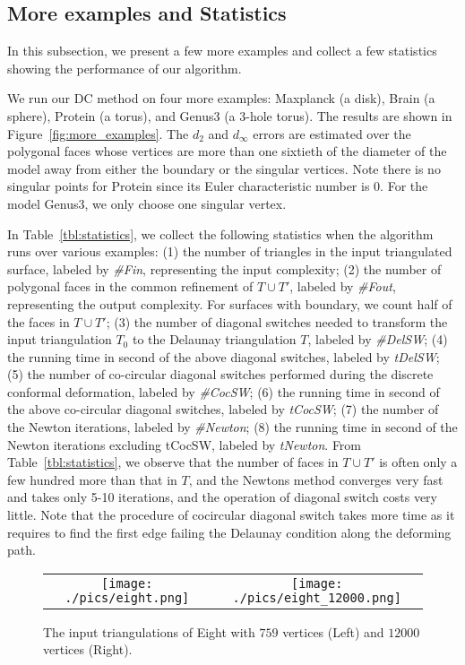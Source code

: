 \documentclass[11pt]{article}
\begin{document}
\subsection{More examples and Statistics}
In this subsection, we present a few more examples and collect a few statistics
showing the performance of our algorithm. 

We run our DC method on four more examples: Maxplanck (a disk), 
Brain (a sphere), Protein (a torus), and Genus3 (a 3-hole torus). 
The results are shown in Figure~\ref{fig:more_examples}.  
The $d_2$ and  $d_\infty$ errors are estimated over the polygonal faces
whose vertices are more than one sixtieth of the diameter of the 
model away from either the boundary or the singular vertices.
Note there is no singular points for Protein since its Euler characteristic
number is $0$. For the model Genus3, we only choose one singular vertex.





In Table~\ref{tbl:statistics}, we collect the following statistics when the algorithm
runs over various examples: (1) the number of triangles in the input triangulated 
surface, labeled by {\it \#Fin}, representing the input complexity; (2) the number of 
polygonal faces in the common refinement of $T\cup T'$, labeled by {\it \#Fout}, representing
the output complexity. For surfaces with boundary, we count half of the faces
in $T\cup T'$; (3) the number of diagonal switches needed to transform the input triangulation
$T_0$ to the Delaunay triangulation $T$, labeled by {\it \#DelSW}; (4) the running time in second
of the above diagonal switches, labeled by {\it tDelSW}; (5) the number of co-circular diagonal switches performed
during the discrete conformal deformation, labeled by {\it \#CocSW}; (6) the running time in second
of the above co-circular diagonal switches, labeled by {\it tCocSW}; (7) the number of the Newton iterations, labeled by
{\it \#Newton}; (8) the running time in second of the Newton iterations excluding tCocSW, labeled by {\it tNewton}.
From Table~\ref{tbl:statistics}, we observe that the number of faces in $T\cup T'$ is often only a few hundred more
than that in $T$, and the Newtons method converges very fast and takes only 5-10 iterations, 
and the operation of diagonal switch costs very little. Note that the procedure of cocircular diagonal 
switch takes more time as it requires to find the first edge failing the Delaunay condition along the 
deforming path. 

\begin{figure}[t]
\begin{center}
\begin{tabular}{cc}
\texttt{[image: ./pics/eight.png]} & 
\texttt{[image: ./pics/eight\_12000.png]} \\
\end{tabular}
\end{center}
\vspace{-0.1in}
\caption{
The input triangulations of Eight with $759$ vertices (Left) and $12000$ vertices (Right). 
\label{fig:eight_input}}
\end{figure}
\end{document}
